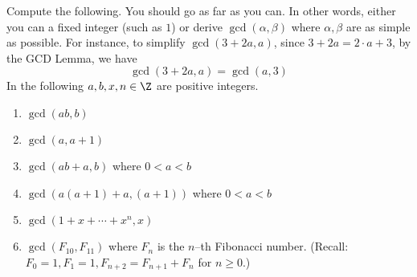   Compute the following.
  You should go as far as you can.
  In other words, either you can a fixed integer (such as $1$) or
  derive $\gcd(\alpha, \beta)$ where $\alpha, \beta$ are
  as simple as possible.
  For instance, to simplify $\gcd(3 + 2a, a)$, since $3 + 2a = 2 \cdot a + 3$,
  by the GCD Lemma, we have
  \[
  \gcd(3 + 2a, a) = \gcd(a, 3)
  \]
  In the following $a, b, x, n \in \Z$ are positive integers.
  \begin{enumerate}[nosep,label=\textnormal{(\alph*)}]
  \item $\gcd(ab, b)$
  \item $\gcd(a, a + 1)$
  \item $\gcd(ab + a, b)$ where $0 < a < b$
  \item $\gcd(a(a+1) + a, (a+1))$ where $0 < a < b$
  \item $\gcd(1 + x + \cdots + x^n, x)$
  \item $\gcd(F_{10}, F_{11})$ where $F_n$ is the $n$--th Fibonacci number.
    (Recall: $F_0 = 1, F_1 = 1, F_{n + 2} = F_{n + 1} + F_n$ for $n \geq 0$.)
  \end{enumerate}
